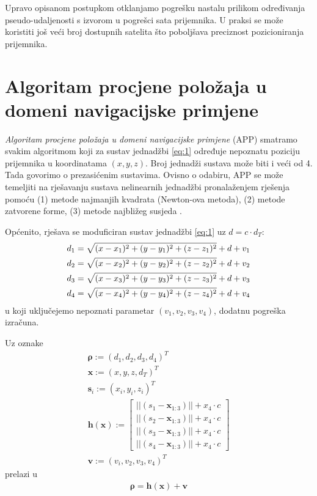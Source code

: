 \documentclass[a4paper,twoside,12pt]{memoir} %
\begin{document}
	Upravo opisanom postupkom otklanjamo pogrešku nastalu prilikom 
	određivanja pseudo-udaljenosti 
	s izvorom u pogrešci sata prijemnika.
	U praksi se može koristiti još veći broj dostupnih satelita što poboljšava 
	preciznost pozicioniranja prijemnika.

\chapter[Algoritam procjene položaja (APP)]{Algoritam procjene položaja u domeni navigacijske primjene}\label{sec:algoritam}

\textit{Algoritam procjene položaja u domeni navigacijske primjene} (APP)
smatramo svakim algoritmom koji za sustav jednadžbi \ref{eq:1}
određuje nepoznatu poziciju prijemnika u koordinatama $(x,y,z)$.
Broj jednadži sustava može biti i veći od 4. Tada govorimo o prezasićenim sustavima.
Ovisno o odabiru, APP se može temeljiti na rješavanju sustava nelinearnih jednadžbi pronalaženjem rješenja pomoću (1) metode najmanjih kvadrata (Newton-ova metoda),
(2) metode zatvorene forme, (3) metode najbližeg susjeda \cite{math:positioning}. 

Općenito, rješava se moduficiran sustav jednadžbi \ref{eq:1} uz $d = c \cdot d_T$:\\
\begin{align}\label{eq:new}
d_1 = \sqrt{(x-x_1)^{2}+(y-y_1)^{2}+(z-z_1)^{2}} +d + v_1\notag \\
d_2 = \sqrt{(x-x_2)^{2}+(y-y_2)^{2}+(z-z_2)^{2}} +d + v_2 \\
d_3 = \sqrt{(x-x_3)^{2}+(y-y_3)^{2}+(z-z_3)^{2}} +d + v_3\notag \\
d_4 = \sqrt{(x-x_4)^{2}+(y-y_4)^{2}+(z-z_4)^{2}} +d + v_4\notag
\end{align}
u koji uključejemo nepoznati parametar $(v_1,v_2,v_3,v_4)$, dodatnu pogreška
izračuna.

Uz oznake 
\begin{align}
\mathbf{\rho} := (d_1, d_2, d_3, d_4)^T \\ 
\mathbf{x} := (x,y,z,d_T)^T \\ 
\mathbf{s}_i := (x_i,y_i,z_i)^T \\ 
\mathbf{h} (\mathbf{x}) := 
\begin{bmatrix}
||(s_1-\mathbf{x}_{1:3})|| + x_4\cdot c\\
||(s_2-\mathbf{x}_{1:3})|| + x_4\cdot c\\
||(s_3-\mathbf{x}_{1:3})|| + x_4\cdot c\\
||(s_4-\mathbf{x}_{1:3})|| + x_4\cdot c
\end{bmatrix} \\
\mathbf{v} := (v_i,v_2,v_3,v_4)^T \label{eq:v}
\end{align}%
prelazi u
\begin{align}\label{eq:matrix}
\mathbf{\rho} = \mathbf{h}(\mathbf{x})+\mathbf{v}
\end{align}%
\end{document}
